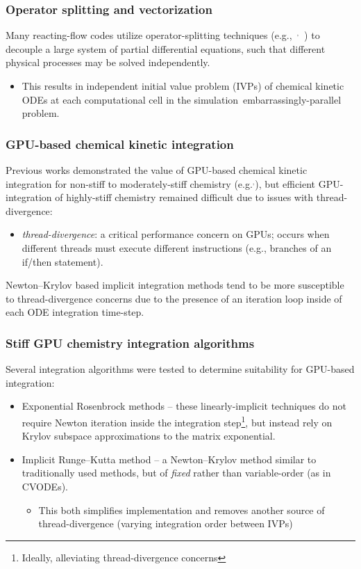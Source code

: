 \documentclass{beamer}
\begin{document}
\begin{frame}
 \frametitle{Operator splitting and vectorization}
 Many reacting-flow codes utilize operator-splitting techniques (e.g.,~$^{,}$~) to decouple a large system of partial differential equations, such that different physical processes may be solved independently.
 \begin{itemize}
  \item This results in independent initial value problem (IVPs) of chemical kinetic ODEs at each computational cell in the simulation\textrightarrow~embarrassingly-parallel problem.
 \end{itemize}
\end{frame}

\begin{frame}
 \frametitle{GPU-based chemical kinetic integration}
 Previous works demonstrated the value of GPU-based chemical kinetic integration for non-stiff to moderately-stiff chemistry (e.g.$^,$), but efficient GPU-integration of highly-stiff chemistry remained difficult due to issues with thread-divergence:
 \begin{itemize}
  \item \textit{thread-divergence}: a critical performance concern on GPUs; occurs when different threads must execute different instructions (e.g., branches of an if\slash then statement).
 \end{itemize}
 Newton--Krylov based implicit integration methods tend to be more susceptible to thread-divergence concerns due to the presence of an iteration loop inside of each ODE integration time-step.
\end{frame}

\begin{frame}
 \frametitle{Stiff GPU chemistry integration algorithms}
 Several integration algorithms were tested to determine suitability for GPU-based integration:
 \begin{itemize}
  \item Exponential Rosenbrock methods -- these linearly-implicit techniques do not require Newton iteration inside the integration step\footnote{Ideally, alleviating thread-divergence concerns}, but instead rely on Krylov subspace approximations to the matrix exponential.
  \item Implicit Runge--Kutta method -- a Newton--Krylov method similar to traditionally used methods, but of \textit{fixed} rather than variable-order (as in CVODEs).
  \begin{itemize}
   \item[\textrightarrow] This both simplifies implementation and removes another source of thread-divergence (varying integration order between IVPs)
  \end{itemize}
 \end{itemize}
\end{frame}
\end{document}
